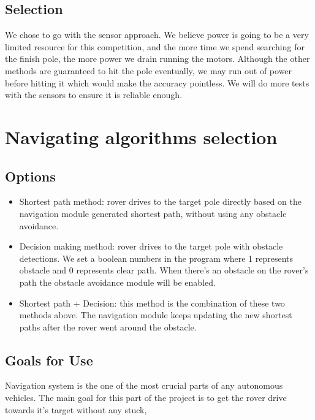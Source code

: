 \documentclass[10pt,letterpaper,onecolumn,journal]{IEEEtran}
\begin{document}
\subsection{Selection}
We chose to go with the sensor approach. We believe power is going to be a very limited resource for this competition, and the more time we spend searching for the finish pole, the more power we drain running the motors. Although the other methods are guaranteed to hit the pole eventually, we may run out of power before hitting it which would make the accuracy pointless. We will do more tests with the sensors to ensure it is reliable enough.

\section{Navigating algorithms selection}

\subsection{Options}
\begin{itemize}
	\item Shortest path method: rover drives to the target pole directly based on the navigation module generated shortest path, without using any obstacle avoidance.
	
	\item Decision making method: rover drives to the target pole with obstacle detections. We set a boolean numbers in the program where 1 represents obstacle and 0 represents clear path. When there's an obstacle on the rover's path the obstacle avoidance module will be enabled. \cite{astarkfuture}
	
	\item Shortest path + Decision: this method is the combination of these two methods above. The navigation module keeps updating the new shortest paths after the rover went around the obstacle.\cite{Dhanasingaraja}
\end{itemize}
\subsection{Goals for Use}
Navigation system is the one of the most crucial parts of any autonomous vehicles. The main goal for this part of the project is to get the rover drive towards it's target without any stuck,   
\end{document}
